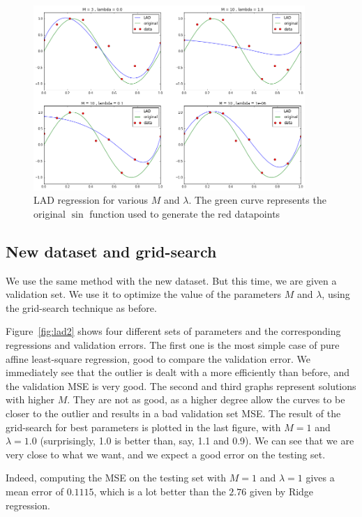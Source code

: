 \begin{figure}[h]
  \centering
 \includegraphics[width=10.3cm]{../Figures/Q4/LAD1.png}
\caption{LAD regression for various $M$ and $\lambda$. The green curve represents the original $\sin$ function used to generate the red datapoints}
\label{fig:lad1}
\end{figure}



\subsection{New dataset and grid-search}
We use the same method with the new dataset. But this time, we are given a validation set. We use it to optimize the value of the parameters $M$ and $\lambda$, using the grid-search technique as before.

Figure~\ref{fig:lad2} shows four different sets of parameters and the corresponding regressions and validation errors. The first one is the most simple case of pure affine least-square regression, good to compare the validation error. We  immediately see that the outlier is dealt with a more efficiently than before, and the validation MSE is very good. The second and third graphs represent solutions with higher $M$. They are not as good, as a higher degree allow the curves to be closer to the outlier and results in a bad validation set MSE.
The result of the grid-search for best parameters is plotted in the last figure, with $M=1$ and $\lambda = 1.0$ (surprisingly, 1.0 is better than, say, 1.1 and 0.9). We can see that we are very close to what we want, and we expect a good error on the testing set.

Indeed, computing the MSE on the testing set with $M=1$ and $\lambda = 1$ gives a mean error of $0.1115$, which is a lot better than the $2.76$ given by Ridge regression.

